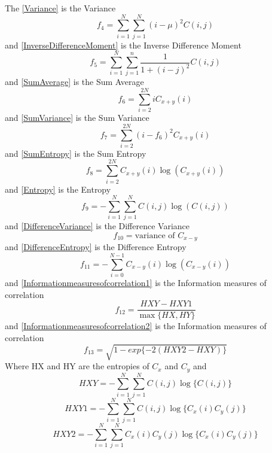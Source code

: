 The \ref{Variance} is the Variance
\begin{equation}\label{Variance}
  f_4 = \sum_{i=1}^{N}\sum_{j=1}^{N}(i-\mu)^2 C(i,j)
\end{equation}
and \ref{InverseDifferenceMoment} is the Inverse Difference Moment
\begin{equation}\label{InverseDifferenceMoment}
  f_5 = \sum_{i=1}^{N}\sum_{j=1}^{n} \frac{1}{1+(i-j)^2} C(i,j)
\end{equation}
and \ref{SumAverage} is the Sum Average
\begin{equation}\label{SumAverage}
  f_6 = \sum_{i=2}^{2N} i C_{x+y}(i)
\end{equation}
and \ref{SumVariance} is the Sum Variance
\begin{equation}\label{SumVariance}
  f_7 = \sum_{i=2}^{2N} (i - f_6)^2 C_{x+y}(i)
\end{equation}
and \ref{SumEntropy} is the Sum Entropy
\begin{equation}\label{SumEntropy}
  f_8 = \sum_{i=2}^{2N}C_{x+y}(i) \log(C_{x+y}(i))
\end{equation}
and \ref{Entropy} is the Entropy
\begin{equation}\label{Entropy}
  f_9 = -\sum_{i=1}^{N}\sum_{j=1}^{N} C(i,j) \log(C(i,j))
\end{equation}
and \ref{DifferenceVariance} is the Difference Variance
\begin{equation}\label{DifferenceVariance}
  f_{10} = \text{variance of }C_{x-y}
\end{equation}
and \ref{DifferenceEntropy} is the Difference Entropy
\begin{equation}\label{DifferenceEntropy}
  f_{11} = -\sum_{i=0}^{N-1} C_{x-y}(i) \log(C_{x-y}(i))
\end{equation}
and \ref{Informationmeasuresofcorrelation1} is the Information measures of correlation
\begin{equation}\label{Informationmeasuresofcorrelation1}
  f_{12} = \frac{HXY-HXY1}{\max\{HX,HY\}}
\end{equation}
and \ref{Informationmeasuresofcorrelation2} is the Information measures of correlation
\begin{equation}\label{Informationmeasuresofcorrelation2}
  f_{13} = \sqrt{1-exp\{-2(HXY2-HXY)\}}
\end{equation}
Where HX and HY are the entropies of $C_x$ and $C_y$ and
\begin{equation}\label{HXY}
  HXY = -\sum_{i=1}^{N}\sum_{j=1}^{N}C(i,j)\log\{C(i,j)\}
\end{equation}
\begin{equation}\label{HXY1}
  HXY1 = -\sum_{i=1}^{N}\sum_{j=1}^{N}C(i,j)\log\{C_x(i)C_y(j)\}
\end{equation}
\begin{equation}\label{HXY2}
  HXY2 = -\sum_{i=1}^{N}\sum_{j=1}^{N}C_x(i)C_y(j)\log\{C_x(i)C_y(j)\}
\end{equation} 